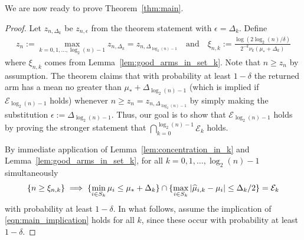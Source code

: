 We are now ready to prove Theorem~\ref{thm:main}.
\begin{proof}
Let $z_{n,\Delta_{k}}$ be $z_{n,\epsilon}$ from the theorem statement with $\epsilon=\Delta_k$. Define
\begin{align*}
z_n := \max_{k=0,1,\dots,\log_2(n)-1} z_{n,\Delta_{k}}= z_{n,\Delta_{\log_2(n)-1}}  \quad \text{and} \quad
\xi_{n,k} := \frac{\log(2 \log_2(n)/\delta)}{2^{-k} \nu_k(\mu_* + \Delta_k)}
\end{align*}
where $\xi_{n,k}$ comes from Lemma~\ref{lem:good_arms_in_set_k}.
Note that $n \geq z_n$ by assumption.
The theorem claims that with probability at least $1-\delta$ the returned arm has a mean no greater than $\mu_* + \Delta_{\log_2(n)-1}$ (which is implied if $\mathcal{E}_{\log_2(n)-1}$ holds) whenever $n \geq z_n = z_{n,\Delta_{\log_2(n)-1}}$ by simply making the substitution $\epsilon := \Delta_{\log_2(n)-1}$.
Thus, our goal is to show that $\mathcal{E}_{\log_2(n)-1}$ holds by proving the stronger statement that $\bigcap_{k=0}^{\log_2(n)-1} \mathcal{E}_k$ holds.

By immediate application of Lemma~\ref{lem:concentration_in_k} and Lemma~\ref{lem:good_arms_in_set_k}, for all $k=0,1,\dots,\log_2(n)-1$ simultaneously
\begin{align}\label{eqn:main_implication}
\{n \geq \xi_{n,k}\}  \implies \{ \min_{i \in S_k} \mu_i \leq \mu_* + \Delta_k \} \cap  \{ \max_{i\in S_k} |\widehat{\mu}_{i,k} - \mu_i| \leq \Delta_k/2 \} = \mathcal{E}_k
\end{align}
with probability at least $1-\delta$.
In what follows, assume the implication of \eqref{eqn:main_implication} holds for all $k$, since these occur with probability at least $1-\delta$.


\end{proof}
